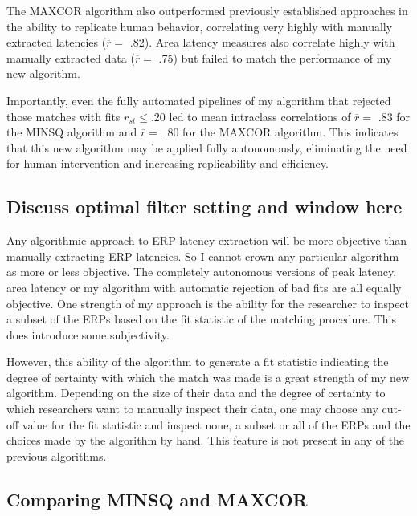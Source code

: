 \documentclass[
  man]{apa7}
\begin{document}
The MAXCOR algorithm also outperformed previously established approaches in the ability to replicate human behavior, correlating very highly with manually extracted latencies (\(\overline{r} =\) .82). Area latency measures also correlate highly with manually extracted data (\(\overline{r} =\) .75) but failed to match the performance of my new algorithm.

Importantly, even the fully automated pipelines of my algorithm that rejected those matches with fits \(r_{st} \le .20\) led to mean intraclass correlations of \(\overline{r} =\) .83 for the MINSQ algorithm and \(\overline{r} =\) .80 for the MAXCOR algorithm. This indicates that this new algorithm may be applied fully autonomously, eliminating the need for human intervention and increasing replicability and efficiency.

\hypertarget{discuss-optimal-filter-setting-and-window-here}{%
\subsection{\texorpdfstring{\textbf{Discuss optimal filter setting and window here}}{Discuss optimal filter setting and window here}}\label{discuss-optimal-filter-setting-and-window-here}}

Any algorithmic approach to ERP latency extraction will be more objective than manually extracting ERP latencies. So I cannot crown any particular algorithm as more or less objective. The completely autonomous versions of peak latency, area latency or my algorithm with automatic rejection of bad fits are all equally objective. One strength of my approach is the ability for the researcher to inspect a subset of the ERPs based on the fit statistic of the matching procedure. This does introduce some subjectivity.

However, this ability of the algorithm to generate a fit statistic indicating the degree of certainty with which the match was made is a great strength of my new algorithm. Depending on the size of their data and the degree of certainty to which researchers want to manually inspect their data, one may choose any cut-off value for the fit statistic and inspect none, a subset or all of the ERPs and the choices made by the algorithm by hand. This feature is not present in any of the previous algorithms.

\hypertarget{comparing-minsq-and-maxcor}{%
\subsection{Comparing MINSQ and MAXCOR}\label{comparing-minsq-and-maxcor}}
\end{document}
